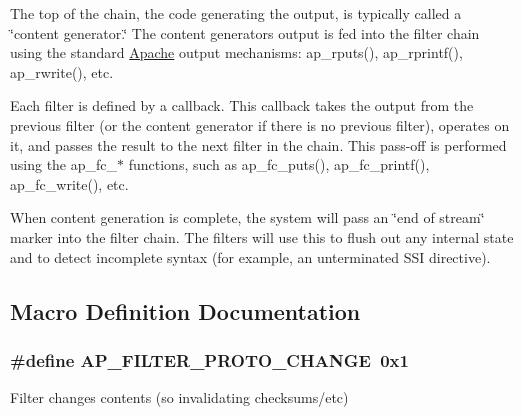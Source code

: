 The top of the chain, the code generating the output, is typically called a \char`\"{}content generator.\char`\"{} The content generator\textquotesingle{}s output is fed into the filter chain using the standard \hyperlink{namespaceApache}{Apache} output mechanisms\+: ap\+\_\+rputs(), ap\+\_\+rprintf(), ap\+\_\+rwrite(), etc.

Each filter is defined by a callback. This callback takes the output from the previous filter (or the content generator if there is no previous filter), operates on it, and passes the result to the next filter in the chain. This pass-\/off is performed using the ap\+\_\+fc\+\_\+$\ast$ functions, such as ap\+\_\+fc\+\_\+puts(), ap\+\_\+fc\+\_\+printf(), ap\+\_\+fc\+\_\+write(), etc.

When content generation is complete, the system will pass an \char`\"{}end of
stream\char`\"{} marker into the filter chain. The filters will use this to flush out any internal state and to detect incomplete syntax (for example, an unterminated S\+SI directive). 

\subsection{Macro Definition Documentation}
\subsubsection[{\texorpdfstring{A\+P\+\_\+\+F\+I\+L\+T\+E\+R\+\_\+\+P\+R\+O\+T\+O\+\_\+\+C\+H\+A\+N\+GE}{AP_FILTER_PROTO_CHANGE}}]{\setlength{\rightskip}{0pt plus 5cm}\#define A\+P\+\_\+\+F\+I\+L\+T\+E\+R\+\_\+\+P\+R\+O\+T\+O\+\_\+\+C\+H\+A\+N\+GE~0x1}\hypertarget{group__APACHE__CORE__FILTER_ga1e0ebc72e7e221c1fa62e81e3a8b3e25}{}\label{group__APACHE__CORE__FILTER_ga1e0ebc72e7e221c1fa62e81e3a8b3e25}
Filter changes contents (so invalidating checksums/etc) 
